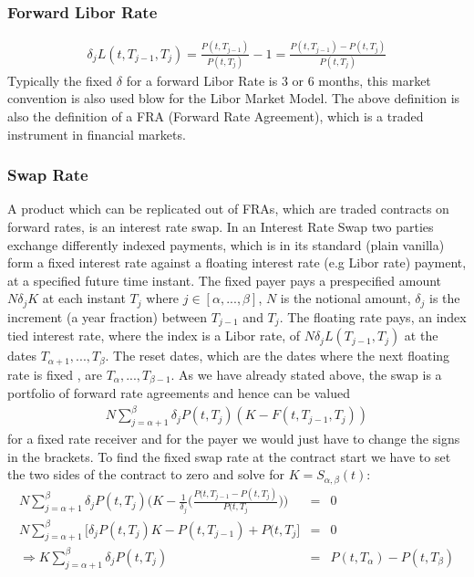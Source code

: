 \documentclass[11pt]{article}
\numberwithin{equation}{subsection}
\begin{document}
\subsubsection{Forward Libor Rate}	
\begin{eqnarray}
\delta_{j} L(t, T_{j-1}, T_j) = \frac{P(t, T_{j-1})}{P(t, T_j)}-1 = \frac{P(t, T_{j-1})-P(t, T_{j})}{P(t, T_{j})}
\end{eqnarray}
Typically the fixed \(\delta\) for a forward Libor Rate is \(3\) or \(6\) months, this market convention is also used blow for the Libor Market Model. The above definition is also the definition of a FRA (Forward Rate Agreement), which is a traded instrument in financial markets.
\subsubsection{Swap Rate}
A product which can be replicated out of FRAs, which are traded contracts on forward rates, is an interest rate swap. In an Interest Rate Swap two parties exchange differently indexed payments, which is in its standard (plain vanilla) form a fixed interest rate against a floating interest rate (e.g Libor rate) payment, at a specified future time instant. The fixed payer pays a prespecified amount \(N\delta_{j}K\) at each instant \(T_j\) where \(j \in [\alpha,...,\beta]\), \(N\) is the notional amount, \(\delta_j\) is the increment (a year fraction) between \(T_{j-1}\) and \(T_j\). The floating rate pays, an index tied interest rate, where the index is a Libor rate, of \(N\delta_{j}L(T_{j-1}, T_j)\) at the dates \(T_{\alpha+1},...,T_{\beta}\). The reset dates, which are the dates where the next floating rate is fixed , are \(T_{\alpha},...,T_{\beta-1}\). As we have already stated above, the swap is a portfolio of forward rate agreements and hence can be valued
\begin{eqnarray*}
N \sum_{j=\alpha+1}^{\beta} \delta_{j} P(t, T_j) (K - F(t, T_{j-1}, T_j))
\end{eqnarray*}
for a fixed rate receiver and for the payer we would just have to change the signs in the brackets.
To find the fixed swap rate at the contract start we have to set the two sides of the contract to zero and solve for \(K=S_{\alpha, \beta}(t)\):
\begin{eqnarray*}
	N \sum_{j=\alpha+1}^{\beta} \delta_{j} P(t, T_j) \bigg(K - \frac{1}{\delta_j} \bigg(\frac{P(t, T_{j-1}-P(t, T_{j})}{P(t, T_{j}}\bigg) \bigg) &=& 0 \\
	N \sum_{j=\alpha+1}^{\beta} \bigg[\delta_{j} P(t, T_j) K - P(t, T_{j-1}) + P(t, T_{j} \bigg] &=& 0 \\
	\Rightarrow K \sum_{j=\alpha+1}^{\beta} \delta_{j} P(t, T_j) &=& P(t, T_{\alpha}) - P(t, T_{\beta})
\end{eqnarray*}
\end{document}
